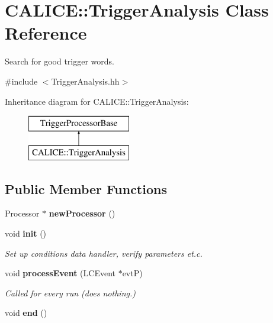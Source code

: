 \section{C\-A\-L\-I\-C\-E\-:\-:Trigger\-Analysis Class Reference}
\label{classCALICE_1_1TriggerAnalysis}


Search for good trigger words.  




{\ttfamily \#include $<$Trigger\-Analysis.\-hh$>$}

Inheritance diagram for C\-A\-L\-I\-C\-E\-:\-:Trigger\-Analysis\-:\begin{figure}[H]
\begin{center}
\leavevmode
\includegraphics[height=2.000000cm]{classCALICE_1_1TriggerAnalysis}
\end{center}
\end{figure}
\subsection*{Public Member Functions}
\begin{DoxyCompactItemize}
\item 
Processor $\ast$ {\bfseries new\-Processor} ()\label{classCALICE_1_1TriggerAnalysis_ab21f54611eb9ddd3ad43fc21503d4e33}

\item 
void {\bf init} ()\label{classCALICE_1_1TriggerAnalysis_a7a51af68dccbac1354f5246cdcea5c83}

\begin{DoxyCompactList}\small\item\em Set up conditions data handler, verify parameters et.\-c. \end{DoxyCompactList}\item 
void {\bf process\-Event} (L\-C\-Event $\ast$evt\-P)
\begin{DoxyCompactList}\small\item\em Called for every run (does nothing.) \end{DoxyCompactList}\item 
void {\bfseries end} ()\label{classCALICE_1_1TriggerAnalysis_a3dc3f0ae7a921facafc54fa4e271f664}

\end{DoxyCompactItemize}
